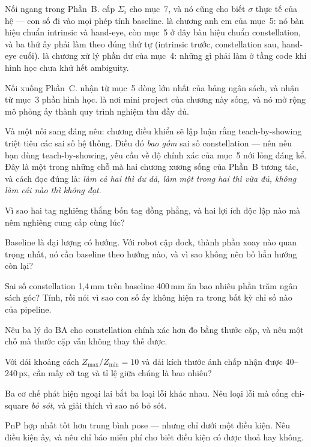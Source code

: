 \documentclass[../../marker.tex]{subfiles}
\begin{document}
Nối ngang trong Phần~B.  cấp \(\Sigma_i\) cho mục~7, và nó cũng cho biết \(\sigma\) thực tế của hệ --- con số đi vào mọi phép tính baseline.  là chương anh em của mục~5: nó bàn hiệu chuẩn intrinsic và hand-eye, còn mục~5 ở đây bàn hiệu chuẩn constellation, và ba thứ ấy phải làm theo đúng thứ tự (intrinsic trước, constellation sau, hand-eye cuối).  là chương xử lý phần dư của mục~4: những gì phải làm ở tầng code khi hình học chưa khử hết ambiguity.

Nối xuống Phần~C.  nhận từ mục~5 dòng lớn nhất của bảng ngân sách, và nhận từ mục~3 phần hình học.  là nơi mini project của chương này sống, và nó mở rộng mô phỏng ấy thành quy trình nghiệm thu đầy đủ.

Và một nối sang  đáng nêu: chương điều khiển sẽ lập luận rằng teach-by-showing triệt tiêu các sai số hệ thống. Điều đó \emph{bao gồm} sai số constellation --- nên nếu bạn dùng teach-by-showing, yêu cầu về độ chính xác của mục~5 nới lỏng đáng kể. Đây là một trong những chỗ mà hai chương xương sống của Phần~B tương tác, và cách đọc đúng là: \emph{làm cả hai thì dư dả, làm một trong hai thì vừa đủ, không làm cái nào thì không đạt}.

\begin{tukiem}
\item Vì sao hai tag nghiêng thắng bốn tag đồng phẳng, và hai lợi ích độc lập nào mà nêm nghiêng cung cấp cùng lúc?
\item Baseline là đại lượng có hướng. Với robot cập dock, thành phần xoay nào quan trọng nhất, nó cần baseline theo hướng nào, và vì sao không nên bỏ hẳn hướng còn lại?
\item Sai số constellation 1,4\,mm trên baseline 400\,mm ăn bao nhiêu phần trăm ngân sách góc? Tính, rồi nói vì sao con số ấy không hiện ra trong bất kỳ chỉ số nào của pipeline.
\item Nêu ba lý do BA cho constellation chính xác hơn đo bằng thước cặp, và nêu một chỗ mà thước cặp vẫn không thay thế được.
\item Với dải khoảng cách \(Z_{\max}/Z_{\min} = 10\) và dải kích thước ảnh chấp nhận được 40--240\,px, cần mấy cỡ tag và tỉ lệ giữa chúng là bao nhiêu?
\item Ba cơ chế phát hiện ngoại lai bắt ba loại lỗi khác nhau. Nêu loại lỗi mà cổng chi-square \emph{bỏ sót}, và giải thích vì sao nó bỏ sót.
\item PnP hợp nhất tốt hơn trung bình pose --- nhưng chỉ dưới một điều kiện. Nêu điều kiện ấy, và nêu chỉ báo miễn phí cho biết điều kiện có được thoả hay không.
\end{tukiem}
\ifSubfilesClassLoaded{\printbibliography[title={Nguồn}]}{}
\end{document}
